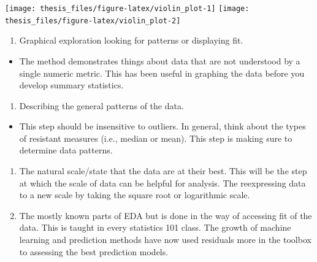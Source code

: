 \documentclass[print]{nuthesis}
\providecommand{\tightlist}{%
  \setlength{\itemsep}{0pt}\setlength{\parskip}{0pt}}
\begin{document}

\begin{center}\texttt{[image: thesis\_files/figure-latex/violin\_plot-1]} \texttt{[image: thesis\_files/figure-latex/violin\_plot-2]} \end{center}


\begin{enumerate}
\def\labelenumi{\arabic{enumi}.}
\tightlist
\item
  Graphical exploration looking for patterns or displaying fit.
\end{enumerate}

\begin{itemize}
\tightlist
\item
  The method demonstrates things about data that are not understood by a single numeric metric.
  This has been useful in graphing the data before you develop summary statistics.
\end{itemize}

\begin{enumerate}
\def\labelenumi{\arabic{enumi}.}
\setcounter{enumi}{1}
\tightlist
\item
  Describing the general patterns of the data.
\end{enumerate}

\begin{itemize}
\tightlist
\item
  This step should be insensitive to outliers.
  In general, think about the types of resistant measures (i.e., median or mean).
  This step is making sure to determine data patterns.
\end{itemize}

\begin{enumerate}
\def\labelenumi{\arabic{enumi}.}
\setcounter{enumi}{2}
\item
  The natural scale/state that the data are at their best.
  This will be the step at which the scale of data can be helpful for analysis.
  The reexpressing data to a new scale by taking the square root or logarithmic scale.
\item
  The mostly known parts of EDA but is done in the way of accessing fit of the data.
  This is taught in every statistics 101 class.
  The growth of machine learning and prediction methods have now used residuals more in the toolbox to assessing the best prediction models.
\end{enumerate}
\end{document}
